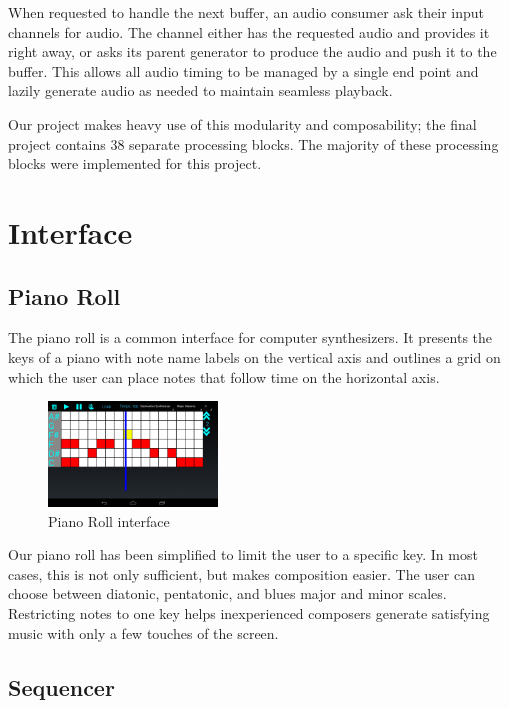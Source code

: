 \documentclass[letterpaper,12pt]{article}
\begin{document}
When requested to handle the next buffer, an audio consumer ask their input channels for audio. The channel either has the requested audio and provides it right away, or asks its parent generator to produce the audio and push it to the buffer. This allows all audio timing to be managed by a single end point and lazily generate audio as needed to maintain seamless playback.

Our project makes heavy use of this modularity and composability; the final project contains 38 separate processing blocks. The majority of these processing blocks were implemented for this project.



\section{Interface}
\label{sec:interface}

\subsection{Piano Roll}
The piano roll is a common interface for computer synthesizers. It  presents the keys of a piano with note name labels on the vertical axis and outlines a grid on which the user can place notes that follow time on the horizontal axis.

\begin{figure}[h]
\centering
\includegraphics[width=0.4\textwidth]{figures/pianoroll.png}
\caption{Piano Roll interface}
\label{fig:pianoroll}
\end{figure}

Our piano roll has been simplified to limit the user to a specific key. In most cases, this is not only sufficient, but makes composition easier. The user can choose between diatonic, pentatonic, and blues major and minor scales. Restricting notes to one key helps inexperienced composers generate satisfying music with only a few touches of the screen. 

\subsection{Sequencer}
\end{document}
